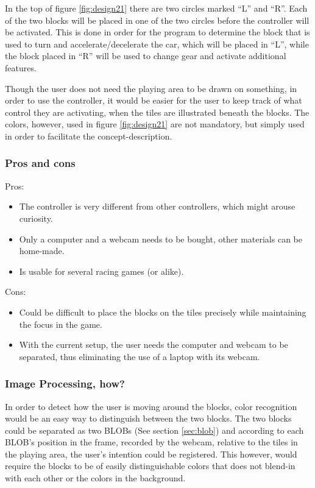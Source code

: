 In the top of figure \ref{fig:design21} there are two circles marked “L” and “R”. Each of the two blocks will be placed in one of the two circles before the controller will be activated. This is done in order for the program to determine the block that is used to turn and accelerate/decelerate the car, which will be placed in “L”, while the block placed in “R” will be used to change gear and activate additional features.

Though the user does not need the playing area to be drawn on something, in order to use the controller, it would be easier for the user to keep track of what control they are activating, when the tiles are illustrated beneath the blocks. The colors, however, used in figure \ref{fig:design21} are not mandatory, but simply used in order to facilitate the concept-description.
\bigskip

\subsubsection*{Pros and cons}
Pros:
\begin{itemize}
\item The controller is very different from other controllers, which might arouse curiosity.
\item Only a computer and a webcam needs to be bought, other materials can be home-made.
\item Is usable for several racing games (or alike).
\end{itemize}
Cons:
\begin{itemize}
\item Could be difficult to place the blocks on the tiles precisely while maintaining the focus in the game.
\item With the current setup, the user needs the computer and webcam to be separated, thus eliminating the use of a laptop with its webcam.
\end{itemize}

\subsubsection*{Image Processing, how?}
In order to detect how the user is moving around the blocks, color recognition would be an easy way to distinguish between the two blocks. The two blocks could be separated as two BLOBs (See section \ref{sec:blob}) and according to each BLOB's position in the frame, recorded by the webcam, relative to the tiles in the playing area, the user's intention could be registered. This however, would require the blocks to be of easily distinguishable colors that does not blend-in with each other or the colors in the background.